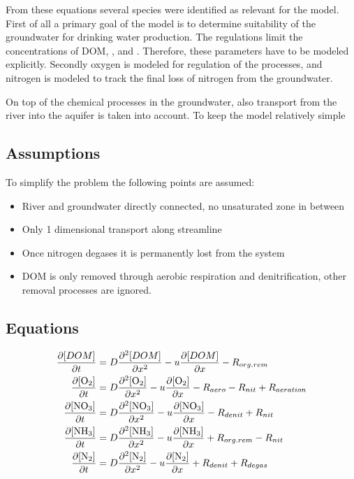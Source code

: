 \documentclass[headings=standardclasses]{scrartcl}
\begin{document}
From these equations several species were identified as relevant for the
model. First of all a primary goal of the model is to determine suitability of
the groundwater for drinking water production. The regulations limit the
concentrations of DOM, , and . Therefore, these parameters have
to be modeled explicitly.
Secondly oxygen is modeled for regulation of the processes, and nitrogen is
modeled to track the final loss of nitrogen from the groundwater.

On top of the chemical processes in the groundwater, also transport from the
river into the aquifer is taken into account. To keep the model relatively
simple

\subsection{Assumptions}
To simplify the problem the following points are assumed:
\begin{itemize}
    \item River and groundwater directly connected, no unsaturated zone in between
    \item Only 1 dimensional transport along streamline
    \item Once nitrogen degases it is permanently lost from the system
    \item DOM is only removed through aerobic respiration and denitrification, other removal processes are ignored.
\end{itemize}

\subsection{Equations}

\begin{align}
    \pdv{[DOM]}{t} &= D\pdv[2]{[DOM]}{x} - u\pdv{[DOM]}{x} - R_{org.rem}\label{eq:diff_dom}\\
    \pdv{[\ce{O2}]}{t} &= D\pdv[2]{[\ce{O2}]}{x} - u\pdv{[\ce{O2}]}{x} - R_{aero} - R_{nit} + R_{aeration}\label{eq:diff_O2}\\
    \pdv{[\ce{NO3}]}{t} &= D\pdv[2]{[\ce{NO3}]}{x} - u\pdv{[\ce{NO3}]}{x} - R_{denit} + R_{nit}\label{eq:diff_NO3}\\
    \pdv{[\ce{NH3}]}{t} &= D\pdv[2]{[\ce{NH3}]}{x} - u\pdv{[\ce{NH3}]}{x} + R_{org.rem} - R_{nit}\label{eq:diff_NH3}\\
    \pdv{[\ce{N2}]}{t} &= D\pdv[2]{[\ce{N2}]}{x} - u\pdv{[\ce{N2}]}{x} + R_{denit} + R_{degas}\label{eq:diff_N2}
\end{align}
\end{document}
